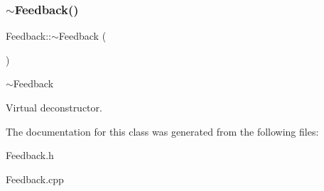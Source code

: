 \subsubsection{\texorpdfstring{$\sim$\+Feedback()}{~Feedback()}}
{\footnotesize\ttfamily Feedback\+::$\sim$\+Feedback (\begin{DoxyParamCaption}{ }\end{DoxyParamCaption})\hspace{0.3cm}{\ttfamily [virtual]}}



$\sim$\+Feedback 

Virtual deconstructor. 

The documentation for this class was generated from the following files\+:\begin{DoxyCompactItemize}
\item 
Feedback.\+h\item 
Feedback.\+cpp\end{DoxyCompactItemize}
